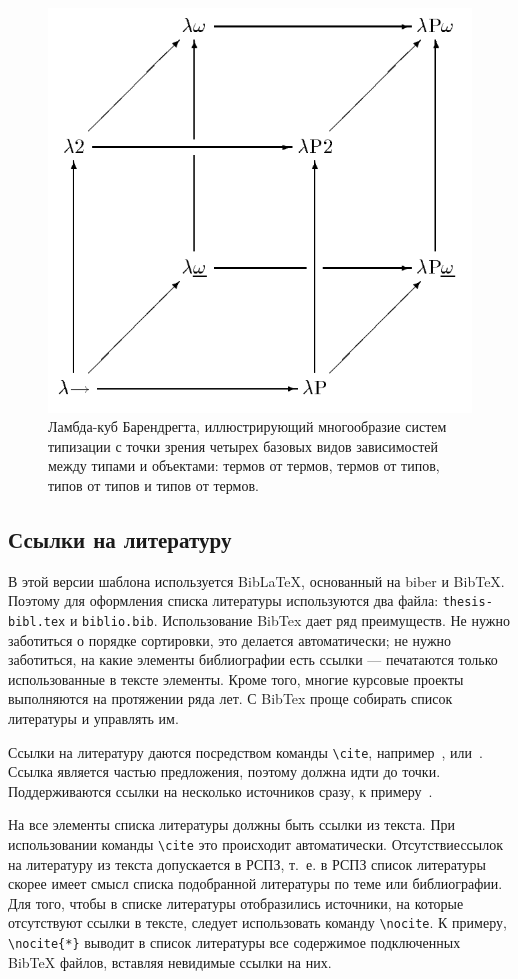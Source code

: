 \begin{figure}[t]%
	\begin{center}
		\includegraphics[width=.5\columnwidth]{assets/img/lambda-cube.png}%
	\end{center}
	\caption{Ламбда-куб Барендрегта, иллюстрирующий многообразие систем типизации с точки зрения четырех базовых видов зависимостей между типами и объектами: термов от термов, термов от типов, типов от типов и типов от термов.}%
	\label{pic:lambda-cube-long-caption}%
\end{figure}

\subsection{Ссылки на литературу}

В этой версии шаблона используется BibLaTeX, основанный на biber и BibTeX.
Поэтому для оформления списка литературы используются два файла:
\texttt{thesis-bibl.tex} и \texttt{biblio.bib}. Использование BibTex дает ряд
преимуществ. Не нужно заботиться о порядке сортировки, это делается
автоматически; не нужно заботиться, на какие элементы библиографии есть ссылки
--- печатаются только использованные в тексте элементы. Кроме того, многие
курсовые проекты выполняются на протяжении ряда лет. С BibTex проще собирать
список литературы и управлять им.

Ссылки на литературу даются посредством команды \texttt{\textbackslash{}cite},
например~\cite{Lermontov}, или~\cite{Pokrovski}. Ссылка является частью
предложения, поэтому должна идти до точки. Поддерживаются ссылки на несколько
источников сразу, к примеру~\cite{Borozda,Lagkueva,Methodology,Lermontov}.

На все элементы списка литературы должны быть ссылки из текста. При
использовании команды \texttt{\textbackslash{}cite} это происходит
автоматически. Отсутствиессылок на литературу из текста допускается в РСПЗ,
т.~е. в РСПЗ список литературы скорее имеет смысл списка подобранной литературы
по теме или библиографии. Для того, чтобы в списке литературы отобразились
источники, на которые отсутствуют ссылки в тексте, следует использовать команду
\texttt{\textbackslash{}nocite}. К примеру, \texttt{\textbackslash{}nocite\{*\}}
выводит в список литературы все содержимое подключенных BibTeX файлов, вставляя
невидимые ссылки на них.

